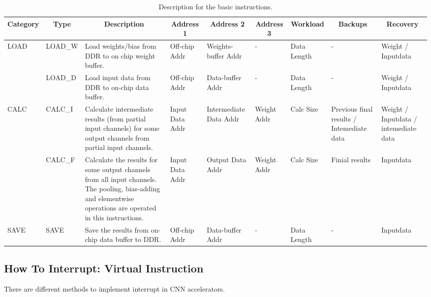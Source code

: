\begin{table}[t]
	\footnotesize
	\centering
	\caption{Description for the basic instructions.}
\begin{tabular}{|p{2.7em}|p{3.4em}|p{16em}|p{4.2em}|p{4.6em}|p{4.2em}|p{4.2em}||p{7em}|p{7em}|}
	\hline
	\multicolumn{1}{|c|}{Category} & \multicolumn{1}{c|}{Type} & \multicolumn{1}{c|}{Description} & \multicolumn{1}{c|}{Address 1} & \multicolumn{1}{c|}{Address 2} & \multicolumn{1}{c|}{Address 3} & \multicolumn{1}{c||}{Workload} & \multicolumn{1}{c|}{Backups} & \multicolumn{1}{c|}{Recovery} \bigstrut\\
	\hline
	\multirow{2}[4]{*}{LOAD} & LOAD\_W & Load weights/bias from DDR to on chip weight buffer. & Off-chip Addr & Weights-buffer Addr & -     & Data  Length & -     & Weight / Inputdata \bigstrut\\
	\cline{2-9}\multicolumn{1}{|c|}{} & LOAD\_D & Load input data from DDR to on-chip data buffer. & Off-chip Addr & Data-buffer Addr & -     & Data  Length & -     & Weight / Inputdata \bigstrut\\
	\hline
	\multirow{2}[4]{*}{CALC} & CALC\_I & Calculate intermediate results (from partial input channels) for some output channels from partial  input channels. & Input  Data Addr & Intermediate Data Addr & Weight Addr & Calc Size & Previous final results / Intemediate data  & Weight / Inputdata /  intemediate data \bigstrut\\
	\cline{2-9}\multicolumn{1}{|c|}{} & CALC\_F & Calculate the results for some output channels from all input channels. The pooling, bias-adding and elementwise operations are operated in this instructions. & Input  Data Addr & Output  Data Addr & Weight Addr & Calc Size & Finial results & Inputdata \bigstrut\\
	\hline
	SAVE  & SAVE  & Save the results from on-chip data buffer to DDR. & Off-chip Addr & Data-buffer Addr & -     & Data  Length & -     & Inputdata \bigstrut\\
	\hline
	\end{tabular}%
	
	\label{tab:instr}%
  \end{table}%




\subsection{How To Interrupt: Virtual Instruction}
\label{sec:howinter}
There are different methods to implement interrupt in CNN accelerators.

